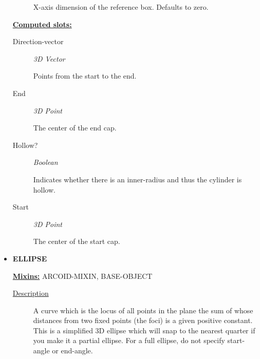 \documentclass [11pt]{book}
\begin{document}
\begin{itemize}
\begin{description}
 X-axis dimension of the reference box. Defaults to zero.




\end{description}






\textbf{
\underline{Computed slots:}}

\begin{description}

\item [Direction-vector]
\emph{3D Vector}

 Points from the start to the end.




\item [End]
\emph{3D Point}

 The center of the end cap.




\item [Hollow?]
\emph{Boolean}

 Indicates whether there is an inner-radius and thus the cylinder is hollow.




\item [Start]
\emph{3D Point}

 The center of the start cap.




\end{description}







\item {}
\textbf{ELLIPSE}


\textbf{
\underline{Mixins:}} ARCOID-MIXIN, BASE-OBJECT





\begin{description}

\item [
\underline{Description}]


A curve which is the locus of all points in the plane 
the sum of whose distances from two fixed points (the foci) is a given positive constant.
This is a simplified 3D ellipse which will snap to the nearest quarter if you make it a 
partial ellipse. For a full ellipse, do not specify start-angle or end-angle.




\end{description}
\end{itemize}
\end{document}
